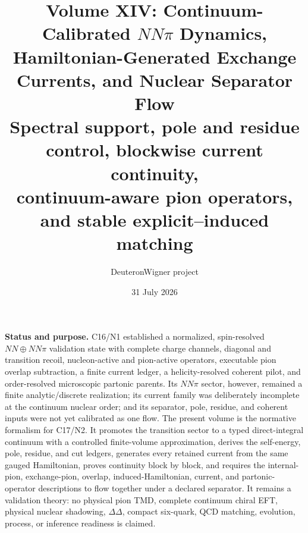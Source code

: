 \documentclass[11pt]{article}
\title{\vspace{-1.0cm}
{\color{navy}\bfseries Volume XIV: Continuum-Calibrated \(NN\pi\) Dynamics,\\[2mm]
Hamiltonian-Generated Exchange Currents, and Nuclear Separator Flow}\\[4mm]
\large Spectral support, pole and residue control, blockwise current continuity,\\
continuum-aware pion operators, and stable explicit--induced matching}
\author{DeuteronWigner project}
\date{31 July 2026}
\begin{document}
\maketitle

\begin{center}
\begin{minipage}{0.94\textwidth}
\colorbox{softblue}{\parbox{0.96\textwidth}{
\textbf{Status and purpose.}
C16/N1 established a normalized, spin-resolved
\(NN\oplus NN\pi\) validation state with complete charge channels, diagonal
and transition recoil, nucleon-active and pion-active operators, executable
pion overlap subtraction, a finite current ledger, a helicity-resolved
coherent pilot, and order-resolved microscopic partonic parents.  Its
\(NN\pi\) sector, however, remained a finite analytic/discrete realization;
its current family was deliberately incomplete at the continuum nuclear
order; and its separator, pole, residue, and coherent inputs were not yet
calibrated as one flow.  The present volume is the normative formalism for
C17/N2.  It promotes the transition sector to a typed direct-integral
continuum with a controlled finite-volume approximation, derives the
self-energy, pole, residue, and cut ledgers, generates every retained current
from the same gauged Hamiltonian, proves continuity block by block, and
requires the internal-pion, exchange-pion, overlap, induced-Hamiltonian,
current, and partonic-operator descriptions to flow together under a declared
separator.  It remains a validation theory: no physical pion TMD, complete
continuum chiral EFT, physical nuclear shadowing, \(\Delta\Delta\), compact
six-quark, QCD matching, evolution, process, or inference readiness is
claimed.
}}
\end{minipage}
\end{center}
\end{document}
